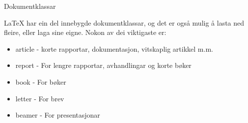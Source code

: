 	\begin{frame}{Dokumentklassar}
		
		\LaTeX{} har ein del innebygde dokumentklassar, og det er også mulig å lasta ned fleire, eller laga sine eigne. Nokon av dei viktigaste er:
		
		\begin{itemize}
			\item article - korte rapportar, dokumentasjon, vitskaplig artikkel m.m.
			\item report - For lengre rapportar, avhandlingar og korte bøker
			\item book - For bøker
			\item letter - For brev
			\item beamer - For presentasjonar
		\end{itemize}
		
	\end{frame}



